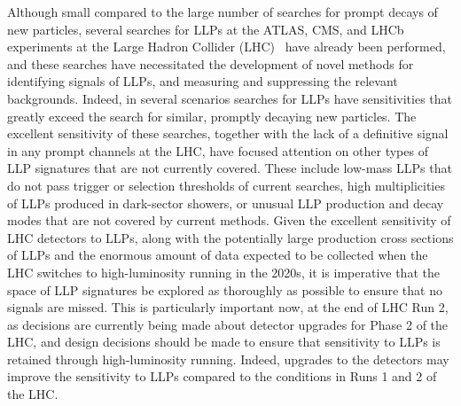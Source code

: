 Although small compared to the large number of searches for prompt decays of new particles, several searches for LLPs at the ATLAS, CMS, and LHCb experiments at the Large Hadron Collider (LHC)~\cite{another-massive-cite-dump} have already been performed, and these searches have necessitated the development of novel methods for identifying signals of LLPs, and measuring and suppressing the relevant backgrounds.
Indeed, in several scenarios searches for LLPs have sensitivities that greatly exceed the search for similar, promptly decaying new particles.
The excellent sensitivity of these searches, together with the lack of a definitive signal in any prompt channels at the LHC, have focused attention on other types of LLP signatures that are not currently covered.
These include low-mass LLPs that do not pass trigger or selection thresholds of current searches, high multiplicities of LLPs produced in dark-sector showers, or unusual LLP production and decay modes that are not covered by current methods.
Given the excellent  sensitivity of LHC detectors to LLPs, along with the potentially large production cross sections of LLPs and the enormous amount of data expected to be collected when the LHC switches to high-luminosity running in the 2020s, it is imperative that the space of LLP signatures be explored as thoroughly as possible to ensure that no signals are missed.
This is particularly important now, at the end of LHC Run 2, as decisions are currently being made about detector upgrades for Phase 2 of the LHC, and design decisions should be made to ensure that sensitivity to LLPs is retained through high-luminosity running.
Indeed, upgrades to the detectors may improve the sensitivity to LLPs compared to the conditions in Runs 1 and 2 of the LHC.

